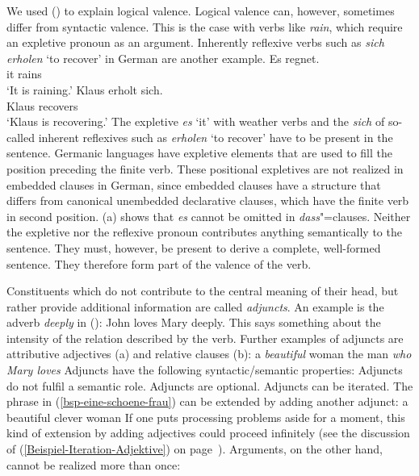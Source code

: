 {We used () to explain logical valence. Logical valence can, however, sometimes differ from syntactic
valence. This is the case with verbs like \emph{rain}, which
require an expletive pronoun as an argument. 
Inherently reflexive verbs
such as \emph{sich erholen} `to recover' in German are another example. %
\eal
\ex\label{Beispiel-es-regnet}
\gll Es regnet.\\
     it rains\\
\glt `It is raining.'
\ex\label{Beispiel-erholt-sich}
\gll Klaus erholt sich.\\
     Klaus recovers \\
\glt `Klaus is recovering.'
\zl
The expletive \emph{es} `it' with weather verbs and the \emph{sich} of so-called inherent reflexives such as \emph{erholen} `to recover' have to
be present in the sentence. Germanic languages have expletive elements that are used to fill the
position preceding the finite verb. These positional expletives are not realized in embedded clauses in
German, since embedded clauses have a structure that differs from canonical unembedded declarative
clauses, which have the finite verb in second position. (a) shows that \emph{es} cannot
be omitted in \emph{dass}"=clauses.
\eal
{}
\zl
Neither the expletive nor the reflexive pronoun contributes anything semantically to the sentence. They must, however, be present to derive a complete,
well-formed sentence. They therefore form part of the valence of the verb.



Constituents which do not contribute to the central meaning of their head, but rather provide additional information are called \emph{adjuncts}.
An example is the adverb \emph{deeply} in ():
\ea
John loves Mary deeply.
\z
This says something about the intensity of the relation described by the verb. Further examples of adjuncts are attributive adjectives (a) and relative clauses (b):
\eal
\ex\label{bsp-eine-schoene-frau}
a {\em beautiful\/} woman
\ex the man {\em who Mary loves\/}
\zl
Adjuncts have the following syntactic/semantic properties:
\eal
\label{adj-kriterien}
\ex Adjuncts do not fulfil a semantic role.
\ex Adjuncts are optional.
\ex Adjuncts can be iterated.
\zl
The phrase in (\ref{bsp-eine-schoene-frau}) can be extended by adding another adjunct:
\ea
a beautiful clever woman
\z
If one puts processing problems aside for a moment, this kind of extension by adding adjectives could proceed infinitely
(see the discussion of (\ref{Beispiel-Iteration-Adjektive}) on page~\pageref{Beispiel-Iteration-Adjektive}). Arguments, on the other hand, cannot be realized
more than once:
\z

}
